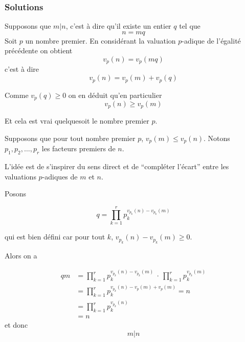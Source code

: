 



\subsubsection{Solutions}


\begin{sol}
\framebox{$\Rightarrow$} Supposons que $m | n$, c'est à dire qu'il existe un entier $q$ tel que
$$n = m q$$
Soit $p$ un nombre premier. En considérant la valuation $p$-adique de l'égalité précédente on obtient
$$v_p(n) = v_p(m q)$$
c'est à dire
$$v_p(n) = v_p(m) + v_p( q)$$

Comme $v_p(q) \ge 0$ on en déduit qu'en particulier
$$v_p(n) \ge v_p(m)$$

Et cela est vrai quelquesoit le nombre premier $p$.

\framebox{$\Leftarrow$} Supposons que pour tout nombre premier $p$,
$v_p(m) \le v_p(n)$. Notons $p_1, p_2, \ldots, p_r$ les facteurs premiers de $n$.

L'idée est de s'inspirer du sens direct et de ``compléter l'écart'' entre les valuations $p$-adiques de $m$ et $n$.

Posons

$$q = \prod_{k=1}^r p_k^{v_{p_k}(n)-v_{p_k}(m)}$$

qui est bien défini car pour tout $k$, $v_{p_k}(n)-v_{p_k}(m) \ge 0$.

Alors on a

$$\begin{aligned}
        q m & = \prod_{k=1}^r p_k^{v_{p_k}(n)-v_{p_k}(m)} ~ \cdot ~\prod_{k=1}^r p_k^{v_{p_k}(m)} \\
            & = \prod_{k=1}^r p_k^{v_{p_k}(n)-v_p(m)+v_p(m)} = n                                   \\
            & = \prod_{k=1}^r p_k^{v_{p_k}(n)}                                                     \\
            & = n
    \end{aligned}$$
et donc
$$m | n$$
\end{sol}


